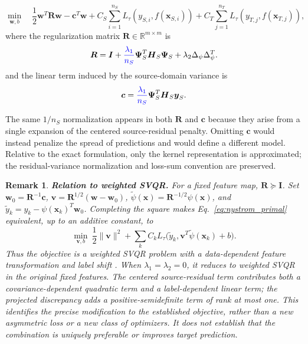 \documentclass[a4paper]{cas-sc}
\newtheorem{remark}{Remark}
\begin{document}
\begin{equation}
\label{eq:nystrom_primal}
\min_{\boldsymbol{w}, b} \quad \frac{1}{2}\boldsymbol{w}^T \boldsymbol{R} \boldsymbol{w} - \boldsymbol{c}^T \boldsymbol{w}
+ C_S \sum_{i=1}^{n_S} L_{\tau}(y_{S,i}, f(\boldsymbol{x}_{S,i}))
+ C_T \sum_{j=1}^{n_T} L_{\tau}(y_{T,j}, f(\boldsymbol{x}_{T,j})),
\end{equation}
where the regularization matrix $\boldsymbol{R} \in \mathbb{R}^{m \times m}$ is
\begin{equation}
\label{eq:reg_matrix}
\boldsymbol{R}=\boldsymbol{I}+{\color{blue}\frac{\lambda_1}{n_S}}\boldsymbol{\Psi}_S^T\boldsymbol{H}_S\boldsymbol{\Psi}_S+\lambda_2\Delta_{\psi}\Delta_{\psi}^T.
\end{equation}
and the linear term induced by the source-domain variance is
\begin{equation}
\label{eq:nystrom_linear}
\boldsymbol{c}={\color{blue}\frac{\lambda_1}{n_S}}\boldsymbol{\Psi}_S^T\boldsymbol{H}_S\boldsymbol{y}_S.
\end{equation}

{\color{blue}The same $1/n_S$ normalization appears in both $\boldsymbol{R}$ and $\boldsymbol{c}$ because they arise from a single expansion of the centered source-residual penalty. Omitting $\boldsymbol{c}$ would instead penalize the spread of predictions and would define a different model. Relative to the exact formulation, only the kernel representation is approximated; the residual-variance normalization and loss-sum convention are preserved.}

\begin{remark}
{\color{blue}\textbf{Relation to weighted SVQR.} For a fixed feature map, $\boldsymbol{R}\succeq\boldsymbol{I}$. Set $\boldsymbol{w}_0=\boldsymbol{R}^{-1}\boldsymbol{c}$, $\boldsymbol{v}=\boldsymbol{R}^{1/2}(\boldsymbol{w}-\boldsymbol{w}_0)$, $\widetilde\psi(\boldsymbol{x})=\boldsymbol{R}^{-1/2}\psi(\boldsymbol{x})$, and $\widetilde y_k=y_k-\psi(\boldsymbol{x}_k)^T\boldsymbol{w}_0$. Completing the square makes Eq.~\eqref{eq:nystrom_primal} equivalent, up to an additive constant, to
\begin{equation}
\label{eq:weighted_svqr_relation}
\min_{\boldsymbol{v},b}\ \frac12\|\boldsymbol{v}\|^2+\sum_k C_k L_\tau\bigl(\widetilde y_k,\boldsymbol{v}^T\widetilde\psi(\boldsymbol{x}_k)+b\bigr).
\end{equation}
Thus the objective is a weighted SVQR problem with a data-dependent feature transformation and label shift \citep{takeuchi2006nonparametric}. When $\lambda_1=\lambda_2=0$, it reduces to weighted SVQR in the original fixed features. The centered source-residual term contributes both a covariance-dependent quadratic term and a label-dependent linear term; the projected discrepancy adds a positive-semidefinite term of rank at most one. This identifies the precise modification to the established objective, rather than a new asymmetric loss or a new class of optimizers. It does not establish that the combination is uniquely preferable or improves target prediction.}
\end{remark}
\end{document}

